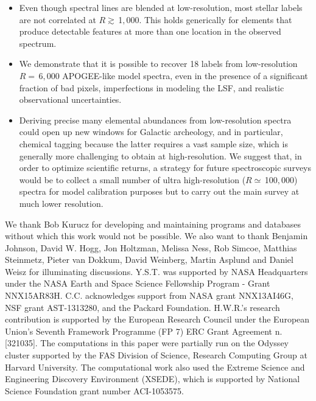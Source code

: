 \documentclass[iop]{emulateapj}
\begin{document}
\begin{CJK*}{UTF8}{gbsn}
\begin{itemize}
\item Even though spectral lines are blended at low-resolution, most stellar labels are not correlated at $R \gtrsim \,$1$,$000. This holds generically for elements that produce detectable features at more than one location in the observed spectrum.

\item We demonstrate that it is possible to recover 18 labels from low-resolution $R = \,$6$,$000 APOGEE-like model spectra, even in the presence of a significant fraction of bad pixels, imperfections in modeling the LSF, and realistic observational uncertainties.

\item Deriving precise many elemental abundances from low-resolution spectra could open up new windows for Galactic archeology, and in particular, chemical tagging because the latter requires a vast sample size, which is generally more challenging to obtain at high-resolution. We suggest that, in order to optimize scientific returns, a strategy for future spectroscopic surveys would be to collect a small number of ultra high-resolution ($R \simeq \,$100$,$000) spectra for model calibration purposes but to carry out the main survey at much lower resolution.

\end{itemize}


%
%
%
%
%
%

\acknowledgments

We thank Bob Kurucz for developing and maintaining programs and databases without which this work would not be possible. We also want to thank Benjamin Johnson, David W. Hogg, Jon Holtzman, Melissa Ness, Rob Simcoe, Matthias Steinmetz, Pieter van Dokkum, David Weinberg, Martin Asplund and Daniel Weisz for illuminating discussions. Y.S.T. was supported by NASA Headquarters under the NASA Earth and Space Science Fellowship Program - Grant NNX15AR83H. C.C. acknowledges support from NASA grant NNX13AI46G, NSF grant AST-1313280, and the Packard Foundation. H.W.R.'s research contribution is supported by the European Research Council under the European Union's Seventh Framework Programme (FP 7) ERC Grant Agreement n.$\,$[321035]. The computations in this paper were partially run on the Odyssey cluster supported by the FAS Division of Science, Research Computing Group at Harvard University. The computational work also used the Extreme Science and Engineering Discovery Environment (XSEDE), which is supported by National Science Foundation grant number ACI-1053575.



\end{CJK*}
\end{document}
